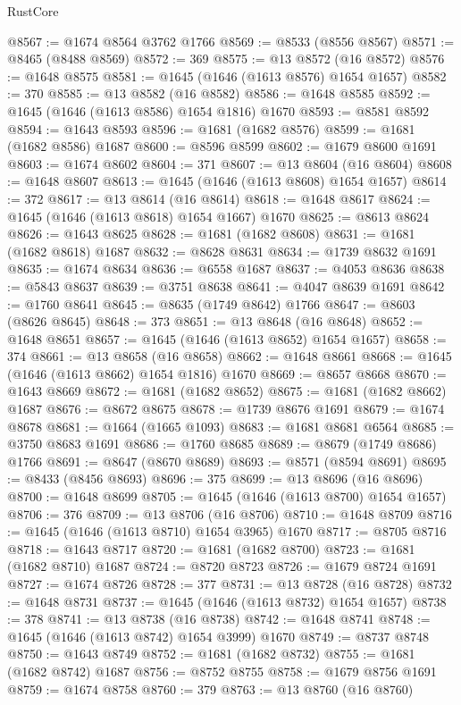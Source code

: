 \begin{lexlean}{RustCore}
\begin{coremodule}
@8567 := @1674 @8564 @3762 @1766
@8569 := @8533 (@8556 @8567)
@8571 := @8465 (@8488 @8569)
@8572 := 369
@8575 := @13 @8572 (@16 @8572)
@8576 := @1648 @8575
@8581 := @1645 (@1646 (@1613 @8576) @1654 @1657)
@8582 := 370
@8585 := @13 @8582 (@16 @8582)
@8586 := @1648 @8585
@8592 := @1645 (@1646 (@1613 @8586) @1654 @1816) @1670
@8593 := @8581 @8592
@8594 := @1643 @8593
@8596 := @1681 (@1682 @8576)
@8599 := @1681 (@1682 @8586) @1687
@8600 := @8596 @8599
@8602 := @1679 @8600 @1691
@8603 := @1674 @8602
@8604 := 371
@8607 := @13 @8604 (@16 @8604)
@8608 := @1648 @8607
@8613 := @1645 (@1646 (@1613 @8608) @1654 @1657)
@8614 := 372
@8617 := @13 @8614 (@16 @8614)
@8618 := @1648 @8617
@8624 := @1645 (@1646 (@1613 @8618) @1654 @1667) @1670
@8625 := @8613 @8624
@8626 := @1643 @8625
@8628 := @1681 (@1682 @8608)
@8631 := @1681 (@1682 @8618) @1687
@8632 := @8628 @8631
@8634 := @1739 @8632 @1691
@8635 := @1674 @8634
@8636 := @6558 @1687
@8637 := @4053 @8636
@8638 := @5843 @8637
@8639 := @3751 @8638
@8641 := @4047 @8639 @1691
@8642 := @1760 @8641
@8645 := @8635 (@1749 @8642) @1766
@8647 := @8603 (@8626 @8645)
@8648 := 373
@8651 := @13 @8648 (@16 @8648)
@8652 := @1648 @8651
@8657 := @1645 (@1646 (@1613 @8652) @1654 @1657)
@8658 := 374
@8661 := @13 @8658 (@16 @8658)
@8662 := @1648 @8661
@8668 := @1645 (@1646 (@1613 @8662) @1654 @1816) @1670
@8669 := @8657 @8668
@8670 := @1643 @8669
@8672 := @1681 (@1682 @8652)
@8675 := @1681 (@1682 @8662) @1687
@8676 := @8672 @8675
@8678 := @1739 @8676 @1691
@8679 := @1674 @8678
@8681 := @1664 (@1665 @1093)
@8683 := @1681 @8681 @6564
@8685 := @3750 @8683 @1691
@8686 := @1760 @8685
@8689 := @8679 (@1749 @8686) @1766
@8691 := @8647 (@8670 @8689)
@8693 := @8571 (@8594 @8691)
@8695 := @8433 (@8456 @8693)
@8696 := 375
@8699 := @13 @8696 (@16 @8696)
@8700 := @1648 @8699
@8705 := @1645 (@1646 (@1613 @8700) @1654 @1657)
@8706 := 376
@8709 := @13 @8706 (@16 @8706)
@8710 := @1648 @8709
@8716 := @1645 (@1646 (@1613 @8710) @1654 @3965) @1670
@8717 := @8705 @8716
@8718 := @1643 @8717
@8720 := @1681 (@1682 @8700)
@8723 := @1681 (@1682 @8710) @1687
@8724 := @8720 @8723
@8726 := @1679 @8724 @1691
@8727 := @1674 @8726
@8728 := 377
@8731 := @13 @8728 (@16 @8728)
@8732 := @1648 @8731
@8737 := @1645 (@1646 (@1613 @8732) @1654 @1657)
@8738 := 378
@8741 := @13 @8738 (@16 @8738)
@8742 := @1648 @8741
@8748 := @1645 (@1646 (@1613 @8742) @1654 @3999) @1670
@8749 := @8737 @8748
@8750 := @1643 @8749
@8752 := @1681 (@1682 @8732)
@8755 := @1681 (@1682 @8742) @1687
@8756 := @8752 @8755
@8758 := @1679 @8756 @1691
@8759 := @1674 @8758
@8760 := 379
@8763 := @13 @8760 (@16 @8760)

\end{coremodule}
\end{lexlean}
